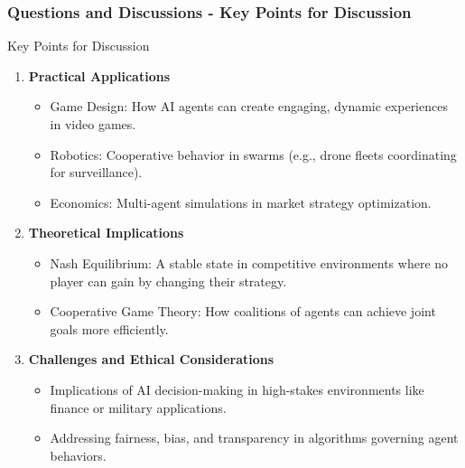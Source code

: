\documentclass[aspectratio=169]{beamer}
\begin{document}
\begin{frame}[fragile]
    \frametitle{Questions and Discussions - Key Points for Discussion}
    \begin{block}{Key Points for Discussion}
        \begin{enumerate}
            \item \textbf{Practical Applications}
                \begin{itemize}
                    \item Game Design: How AI agents can create engaging, dynamic experiences in video games.
                    \item Robotics: Cooperative behavior in swarms (e.g., drone fleets coordinating for surveillance).
                    \item Economics: Multi-agent simulations in market strategy optimization.
                \end{itemize}
            \item \textbf{Theoretical Implications}
                \begin{itemize}
                    \item Nash Equilibrium: A stable state in competitive environments where no player can gain by changing their strategy.
                    \item Cooperative Game Theory: How coalitions of agents can achieve joint goals more efficiently.
                \end{itemize}
            \item \textbf{Challenges and Ethical Considerations}
                \begin{itemize}
                    \item Implications of AI decision-making in high-stakes environments like finance or military applications.
                    \item Addressing fairness, bias, and transparency in algorithms governing agent behaviors.
                \end{itemize}
        \end{enumerate}
    \end{block}
\end{frame}
\end{document}
